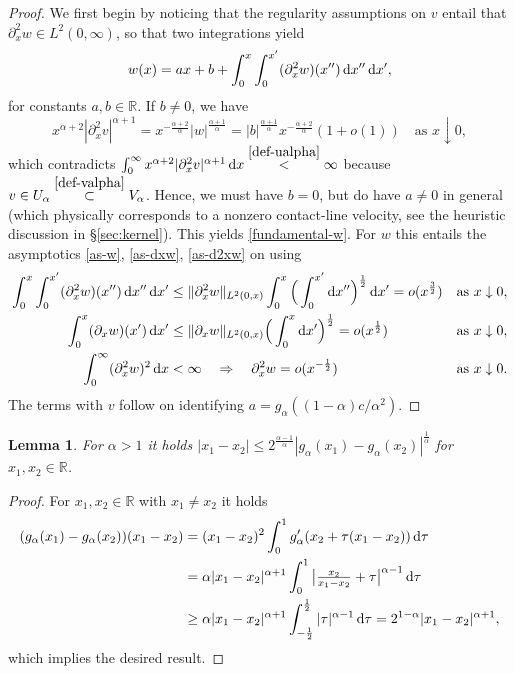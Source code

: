 \documentclass[reqno,12pt]{amsart}
\renewcommand{\d}{\ensuremath{\mathrm{d}}}
\newcommand{\R}{\ensuremath{\mathbb{R}}}
\renewcommand{\d}{\ensuremath{{\rm d}}}
\newtheorem{lemma}[theorem]{Lemma}
\numberwithin{equation}{section}
\begin{document}
%
\begin{proof}
We first begin by noticing that the regularity assumptions on $v$ entail that $\partial_x^2 w \in L^2(0,\infty)$, so that two integrations yield
%
\[
w(x) = a x + b + \int_0^x \int_0^{x'} (\partial_x^2 w)(x'') \, \d x'' \, \d x',
\]
%
for constants $a,b \in \R$. If $b \ne 0$, we have
%
\[
x^{\alpha+2} |\partial_x^2 v|^{\alpha+1} = x^{-\frac{\alpha+2}{\alpha}} |w|^{\frac{\alpha+1}{\alpha}} = |b|^{\frac{\alpha+1}{\alpha}} x^{-\frac{\alpha+2}{\alpha}} (1+o(1)) \quad \text{as } x \downarrow 0,
\]
%
which contradicts $\int_0^\infty x^{\alpha+2} |\partial_x^2 v|^{\alpha+1} \, \d x \stackrel{\eqref{def-ualpha}}{<} \infty$ because $v \in U_\alpha \stackrel{\eqref{def-valpha}}{\subset} V_\alpha$. Hence, we must have $b = 0$, but do have $a \ne 0$ in general (which physically corresponds to a nonzero contact-line velocity, see the heuristic discussion in \S\ref{sec:kernel}). This yields \eqref{fundamental-w}. For $w$ this entails the asymptotics \eqref{as-w}, \eqref{as-dxw}, \eqref{as-d2xw} on using
%
\begin{align*}
\int_0^x \int_0^{x'} (\partial_x^2 w)(x'') \, \d x'' \, \d x' &\le \|\partial_x^2 w\|_{L^2(0,x)} \int_0^x \Big(\int_0^{x'} \d x''\Big)^{\frac 1 2} \, \d x' = o(x^{\frac 3 2}) && \text{as } x \downarrow 0, \\
\int_0^x (\partial_x w)(x') \, \d x' &\le \|\partial_x w\|_{L^2(0,x)} \Big(\int_0^{x} \d x'\Big)^{\frac 1 2} = o(x^{\frac 1 2}) && \text{as } x \downarrow 0, \\
\int_0^\infty (\partial_x^2 w)^2 \, \d x &< \infty \quad \Rightarrow \quad \partial_x^2 w = o(x^{-\frac 1 2}) && \text{as } x \downarrow 0.
\end{align*}
%
The terms with $v$ follow on identifying $a = g_\alpha((1-\alpha) c/\alpha^2)$.
\end{proof}
%

%
\begin{lemma}\label{lem-convex}
For $\alpha > 1$ it holds $|x_1-x_2| \le 2^{\frac{\alpha-1}{\alpha}} |g_\alpha(x_1)-g_\alpha(x_2)|^{\frac 1 \alpha}$ for $x_1,x_2 \in \R$.
\end{lemma}
%

%
\begin{proof}
For $x_1,x_2 \in \R$ with $x_1 \ne x_2$ it holds
%
\begin{align*}
(g_\alpha(x_1)-g_\alpha(x_2))(x_1-x_2) &= (x_1-x_2)^2 \int_0^1 g_\alpha'(x_2 + \tau (x_1-x_2)) \, \d \tau \\
&= \alpha |x_1-x_2|^{\alpha+1} \int_0^1 \big|\tfrac{x_2}{x_1-x_2} + \tau\big|^{\alpha-1} \, \d\tau \\
&\ge \alpha |x_1-x_2|^{\alpha+1} \int_{-\frac 1 2}^{\frac 1 2} |\tau|^{\alpha-1} \, \d\tau = 2^{1-\alpha} |x_1-x_2|^{\alpha+1},
\end{align*}
%
which implies the desired result.
\end{proof}
%
\end{document}
